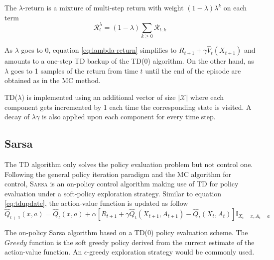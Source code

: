 The $\lambda$-return is a mixture of multi-step return with weight $(1 -
\lambda)\lambda^k$ on each term
\begin{equation}
\mathcal{R}_t^\lambda = (1 - \lambda)\sum_{k \geq 0} \mathcal{R}_{t:k}
\label{eq:lambda-return}
\end{equation}

As $\lambda$ goes to 0, equation \ref{eq:lambda-return}  simplifies to $R_{t+1} +
\gamma \hat{V}_t (X_{t+1})$ and amounts to a one-step TD backup of the TD(0)
algorithm. On the other hand, as $\lambda$ goes to 1 samples of the return from time $t$ until the end of the episode are obtained as in the MC method.

TD($\lambda$) is implemented using an additional vector of size $\left\vert
\mathcal{X} \right\vert$ where each component gets incremented by 1 each time the
corresponding state is visited. A decay of $\lambda \gamma$ is also applied upon
each component for every time step.

\subsection{Sarsa}
The TD algorithm only solves the policy evaluation problem but not control one. Following the general policy iteration paradigm and 
the MC algorithm for control, \textsc{Sarsa} is an on-policy control algorithm making use of
TD for policy evaluation under a soft-policy exploration strategy. Similar to equation
\ref{eq:tdupdate}, the action-value function is updated as follow
\begin{equation}
\hat{Q}_{t+1}(x, a) = \hat{Q}_{t}(x, a) + \alpha \left[ R_{t+1} + \gamma \hat{Q}_t
(X_{t+1}, A_{t+1}) - \hat{Q}_t(X_t, A_t)\right] \mathbb{I}_{X_t = x, A_t = a}
\label{eq:sarsaupdate}
\end{equation}

\begin{algorithm}
\DontPrintSemicolon
{}
\caption{The on-policy Sarsa algorithm based on a TD(0) policy evaluation scheme.
The $Greedy$ function is the soft greedy policy derived from the current estimate of
the action-value function. An $\epsilon$-greedy exploration strategy would be
commonly used.}
\label{alg:sarsa}
\end{algorithm}

